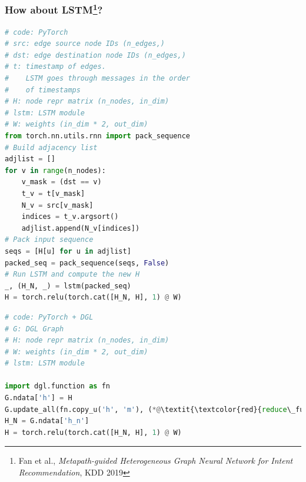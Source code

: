 \documentclass[10pt,aspectratio=169]{beamer}
\begin{document}
	\begin{frame}[fragile]
		\frametitle{How about LSTM\footnote{Fan et al., \emph{Metapath-guided Heterogeneous Graph Neural Network for Intent Recommendation}, KDD 2019}?}
		\begin{minipage}{0.5\textwidth}
\begin{lstlisting}[language=Python]
# code: PyTorch
# src: edge source node IDs (n_edges,)
# dst: edge destination node IDs (n_edges,)
# t: timestamp of edges.
#    LSTM goes through messages in the order
#    of timestamps
# H: node repr matrix (n_nodes, in_dim)
# lstm: LSTM module
# W: weights (in_dim * 2, out_dim)
from torch.nn.utils.rnn import pack_sequence
# Build adjacency list
adjlist = []
for v in range(n_nodes): 
    v_mask = (dst == v) 
    t_v = t[v_mask] 
    N_v = src[v_mask] 
    indices = t_v.argsort() 
    adjlist.append(N_v[indices])
# Pack input sequence
seqs = [H[u] for u in adjlist]
packed_seq = pack_sequence(seqs, False)
# Run LSTM and compute the new H
_, (H_N, _) = lstm(packed_seq)
H = torch.relu(torch.cat([H_N, H], 1) @ W)
\end{lstlisting}
		\end{minipage}%
		\begin{minipage}{0.5\textwidth}
\begin{lstlisting}[language=Python]
# code: PyTorch + DGL
# G: DGL Graph
# H: node repr matrix (n_nodes, in_dim)
# W: weights (in_dim * 2, out_dim)
# lstm: LSTM module

import dgl.function as fn
G.ndata['h'] = H
G.update_all(fn.copy_u('h', 'm'), (*@\textit{\textcolor{red}{reduce\_func}}@*))
H_N = G.ndata['h_n']
H = torch.relu(torch.cat([H_N, H], 1) @ W)
\end{lstlisting}
		\end{minipage}
	\end{frame}
\end{document}
